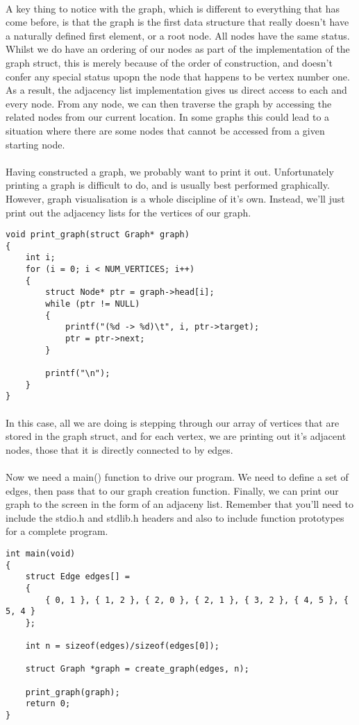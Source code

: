 \documentclass[10pt, a4paper, twosize]{article}
\begin{document}
\paragraph{} A key thing to notice with the graph, which is different to everything that has come before, is that the graph is the first data structure that really doesn't have a naturally defined first element, or a root node. All nodes have the same status. Whilst we do have an ordering of our nodes as part of the implementation of the graph struct, this is merely because of the order of construction, and doesn't confer any special status upopn the node that happens to be vertex number one. As a result, the adjacency list implementation gives us direct access to each and every node. From any node, we can then traverse the graph by accessing the related nodes from our current location. In some graphs this could lead to a situation where there are some nodes that cannot be accessed from a given starting node.

\paragraph{} Having constructed a graph, we probably want to print it out. Unfortunately printing a graph is difficult to do, and is usually best performed graphically. However, graph visualisation is a whole discipline of it's own. Instead, we'll just print out the adjacency lists for the vertices of our graph.
\begin{lstlisting}
void print_graph(struct Graph* graph)
{
	int i;
	for (i = 0; i < NUM_VERTICES; i++)
	{
		struct Node* ptr = graph->head[i];
		while (ptr != NULL)
		{
			printf("(%d -> %d)\t", i, ptr->target);
			ptr = ptr->next;
		}

		printf("\n");
	}
}
\end{lstlisting}
\paragraph{} In this case, all we are doing is stepping through our array of vertices that are stored in the graph struct, and for each vertex, we are printing out it's adjacent nodes, those that it is directly connected to by edges.

\paragraph{} Now we need a main() function to drive our program. We need to define a set of edges, then pass that to our graph creation function. Finally, we can print our graph to the screen in the form of an adjaceny list. Remember that you'll need to include the stdio.h and stdlib.h headers and also to include function prototypes for a complete program.
\begin{lstlisting}
int main(void)
{
    struct Edge edges[] = 
    {
        { 0, 1 }, { 1, 2 }, { 2, 0 }, { 2, 1 }, { 3, 2 }, { 4, 5 }, { 5, 4 }
    };
    
    int n = sizeof(edges)/sizeof(edges[0]);
    
    struct Graph *graph = create_graph(edges, n);
    
    print_graph(graph);
    return 0;
}
\end{lstlisting}
\end{document}
